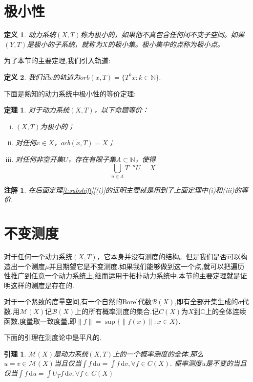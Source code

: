 \documentclass[a4paper,11pt,oneside]{book}
\newtheorem{theorem}{\textbf{\hspace{0.7cm}定理}}[section]
\newtheorem{lemma}{\textbf{\hspace{0.7cm}引理}}[section]
\newtheorem{definition}{\textbf{\hspace{0.7cm}定义}}[section]
\newtheorem{remark}{\textbf{\hspace{0.7cm}注解}}[section]
\newcommand{\B}{\mathcal{B}}
\begin{document}
\section{极小性}
\begin{definition}
动力系统$(X,T)$称为极小的，如果他不真包含任何闭不变子空间。如果$(Y,T)$是极小的子系统，就称为$X$的极小集。极小集中的点称为极小点。
\end{definition}
为了本节的主要定理,我们引入轨道:
\begin{definition}
我们记$x$的轨道为$orb(x,T)=\{T^kx:k\in\mathbb{N}\}.$
\end{definition}
下面是熟知的动力系统中极小性的等价定理:
\begin{theorem}
\label{t:minimal}
对于动力系统$(X,T)$，以下命题等价：
\begin{enumerate}[(i)]
\item $(X,T)$为极小的；
\item 对任何$x\in X$，$\overline{orb(x,T)}=X$；
\item 对任何非空开集$U$，存在有限子集$A\subset \mathbb{N}$，使得$$\bigcup_{n\in A}T^{-n}U=X$$
\end{enumerate}
\end{theorem}
\begin{remark}
在后面定理\ref{t:subshift}[(i)]的证明主要就是用到了上面定理中(i)和(iii)的等价.
\end{remark}



\section{不变测度}
对于任何一个动力系统$(X,T)$，它本身并没有测度的结构。但是我们是否可以构造出一个测度$\mu$并且期望它是不变测度.如果我们能够做到这一个点,就可以把遍历性推广到任意一个动力系统上,继而运用于拓扑动力系统中.本节的主要定理就是证明这样的测度是存在的.

对于一个紧致的度量空间,有一个自然的Borel代数$\B (X)$,即有全部开集生成的$\sigma$代数.用$\mathcal{M}(X)$记$\mathcal{B}(X)$上的所有概率测度的集合.记$C(X)$为$X$到$\mathbb{C}$上的全体连续函数,度量取一致度量,即$\|f\|=\sup\{\|f(x)\|:x\in X\}$.

下面的引理在测度论中是平凡的.
\begin{lemma}
\label{l}
$\mathcal{M}(X)$是动力系统$(X,T)$上的一个概率测度的全体.那么$u=v\in \mathcal{M}(X)$当且仅当$\int\!f \, \mathrm{d}u=\int f\, \mathrm{d}v,\forall f\in C(X)$.
概率测度$u$是不变的当且仅当$\int\!f \, \mathrm{d}u=\int\! U_Tf\, \mathrm{d}v,\forall f\in C(X)$
\end{lemma}
\end{document}
